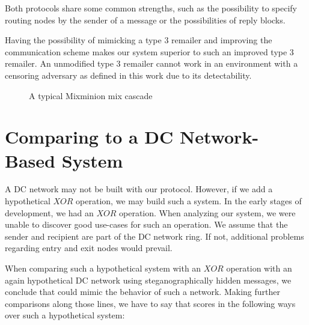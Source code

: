 Both protocols share some common strengths, such as the possibility to specify routing nodes by the sender of a message or the possibilities of reply blocks. 

Having the possibility of mimicking a type 3 remailer and improving the communication scheme makes our system superior to such an improved type 3 remailer. An unmodified type 3 remailer cannot work in an environment with a censoring adversary as defined in this work due to its detectability. 

\begin{figure}[ht]\centering
	
	\caption{A typical Mixminion mix cascade}
	\label{fig:mmCommPattern}
\end{figure}

\section{Comparing \MessageVortex{} to a DC Network-Based System}
A DC network may not be built with our \MessageVortex{} protocol. However, if we add a hypothetical $XOR$ operation, we may build such a system. In the early stages of development, we had an $XOR$ operation. When analyzing our system, we were unable to discover good use-cases for such an operation. We assume that the sender and recipient are part of the DC network ring. If not, additional problems regarding entry and exit nodes would prevail. 

When comparing such a hypothetical \MessageVortex{} system with an $XOR$ operation with an again hypothetical DC network using steganographically hidden messages, we conclude that \MessageVortex{} could mimic the behavior of such a network. Making further comparisons along those lines, we have to say that \MessageVortex{} scores in the following ways over such a hypothetical system:

